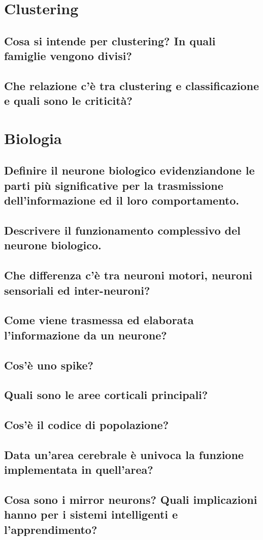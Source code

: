 \documentclass[\main/main.tex]{subfiles}
\begin{document}
\clearpage
\section{Clustering}

\subsection{Cosa si intende per clustering? In quali famiglie vengono divisi?}
\subsection{Che relazione c'è tra clustering e classificazione e quali sono le criticità?}

\clearpage
\section{Biologia}

\subsection{Definire il neurone biologico evidenziandone le parti più significative per la trasmissione dell'informazione ed il loro comportamento.}
\subsection{Descrivere il funzionamento complessivo del neurone biologico.}
\subsection{Che differenza c'è tra neuroni motori, neuroni sensoriali ed inter-neuroni?}
\subsection{Come viene trasmessa ed elaborata l'informazione da un neurone?}
\subsection{ Cos'è uno spike?}
\subsection{ Quali sono le aree corticali principali?}
\subsection{Cos'è il codice di popolazione?}
\subsection{Data un'area cerebrale è univoca la funzione implementata in quell'area?}
\subsection{Cosa sono i mirror neurons? Quali implicazioni hanno per i sistemi intelligenti e l’apprendimento?}
\end{document}
